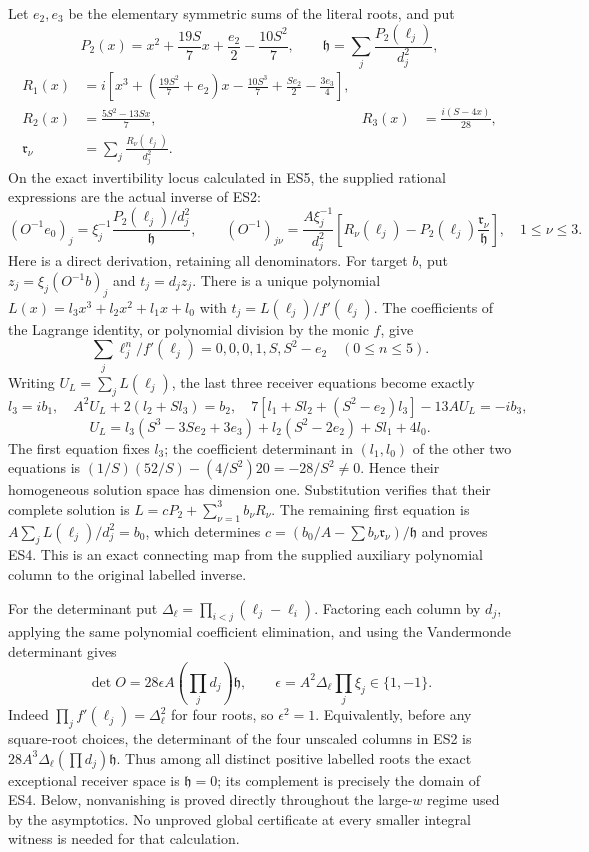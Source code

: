 Let \(e_2,e_3\) be the elementary symmetric sums of the literal roots, and put \[
P_2(x)=x^2+\frac{19S}{7}x+\frac{e_2}{2}-\frac{10S^2}{7},\qquad
\mathfrak h=\sum_j\frac{P_2(\ell_j)}{d_j^2},
\] \[
\begin{aligned}
R_1(x)&=i\left[x^3+\left(\frac{19S^2}{7}+e_2\right)x
-\frac{10S^3}{7}+\frac{Se_2}{2}-\frac{3e_3}{4}\right],\\
R_2(x)&=\frac{5S^2-13Sx}{7},
&R_3(x)&=\frac{i(S-4x)}{28},\\
\mathfrak r_\nu&=\sum_j\frac{R_\nu(\ell_j)}{d_j^2}.
\end{aligned}
\tag{ES3}
\] On the exact invertibility locus calculated in ES5, the supplied rational expressions are the actual inverse of ES2: \[
(O^{-1}e_0)_j=\xi_j^{-1}\frac{P_2(\ell_j)/d_j^2}{\mathfrak h},
\qquad
(O^{-1})_{j\nu}=\frac{A\xi_j^{-1}}{d_j^2}
\left[R_\nu(\ell_j)-P_2(\ell_j)\frac{\mathfrak r_\nu}{\mathfrak h}\right],\quad1\le\nu\le3.
\tag{ES4}
\] Here is a direct derivation, retaining all denominators. For target \(b\), put \(z_j=\xi_j(O^{-1}b)_j\) and \(t_j=d_jz_j\). There is a unique polynomial \(L(x)=l_3x^3+l_2x^2+l_1x+l_0\) with \(t_j=L(\ell_j)/f'(\ell_j)\). The coefficients of the Lagrange identity, or polynomial division by the monic \(f\), give \[
\sum_j\ell_j^n/f'(\ell_j)=0,0,0,1,S,S^2-e_2\quad(0\le n\le5).
\] Writing \(U_L=\sum_jL(\ell_j)\), the last three receiver equations become exactly \[
l_3=ib_1,\quad A^2U_L+2(l_2+Sl_3)=b_2,
\quad7[l_1+Sl_2+(S^2-e_2)l_3]-13AU_L=-ib_3,
\] \[
U_L=l_3(S^3-3Se_2+3e_3)+l_2(S^2-2e_2)+Sl_1+4l_0.
\] The first equation fixes \(l_3\); the coefficient determinant in \((l_1,l_0)\) of the other two equations is \((1/S)(52/S)-(4/S^2)20=-28/S^2\ne0\). Hence their homogeneous solution space has dimension one. Substitution verifies that their complete solution is \(L=cP_2+\sum_{\nu=1}^3b_\nu R_\nu\). The remaining first equation is \(A\sum_jL(\ell_j)/d_j^2=b_0\), which determines \(c=(b_0/A-\sum b_\nu\mathfrak r_\nu)/\mathfrak h\) and proves ES4. This is an exact connecting map from the supplied auxiliary polynomial column to the original labelled inverse.

For the determinant put \(\Delta_\ell=\prod_{i<j}(\ell_j-\ell_i)\). Factoring each column by \(d_j\), applying the same polynomial coefficient elimination, and using the Vandermonde determinant gives \[
\det O=28\epsilon A\left(\prod_jd_j\right)\mathfrak h,
\qquad \epsilon=A^2\Delta_\ell\prod_j\xi_j\in\{1,-1\}.
\tag{ES5}
\] Indeed \(\prod_jf'(\ell_j)=\Delta_\ell^2\) for four roots, so \(\epsilon^2=1\). Equivalently, before any square-root choices, the determinant of the four unscaled columns in ES2 is \(28A^3\Delta_\ell(\prod d_j)\mathfrak h\). Thus among all distinct positive labelled roots the exact exceptional receiver space is \(\mathfrak h=0\); its complement is precisely the domain of ES4. Below, nonvanishing is proved directly throughout the large-\(w\) regime used by the asymptotics. No unproved global certificate at every smaller integral witness is needed for that calculation.

